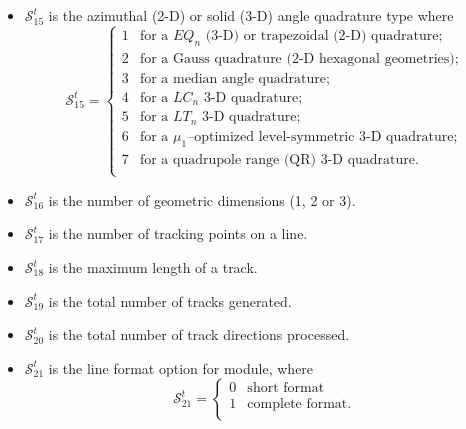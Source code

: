 \begin{itemize}
\item $\mathcal{S}^{t}_{15}$ is the azimuthal (2-D) or solid (3-D) angle quadrature type where
\begin{displaymath}
\mathcal{S}^{t}_{15} = \left\{
\begin{array}{rl}
 1 & \textrm{for a $EQ_n$ (3-D) or trapezoidal (2-D) quadrature;} \\
 2 & \textrm{for a Gauss quadrature (2-D hexagonal geometries);} \\
 3 & \textrm{for a median angle quadrature;} \\
 4 & \textrm{for a $LC_n$ 3-D quadrature;} \\
 5 & \textrm{for a $LT_n$ 3-D quadrature;} \\
 6 & \textrm{for a $\mu_1$--optimized level-symmetric 3-D quadrature;} \\
 7 & \textrm{for a quadrupole range (QR) 3-D quadrature.} \\
\end{array} \right.
\end{displaymath}

\item $\mathcal{S}^{t}_{16}$ is the number of geometric dimensions (1, 2 or 3).

\item $\mathcal{S}^{t}_{17}$ is the number of tracking points on a line.

\item $\mathcal{S}^{t}_{18}$ is the maximum length of a track.

\item $\mathcal{S}^{t}_{19}$ is the total number of tracks generated.

\item $\mathcal{S}^{t}_{20}$ is the total number of track directions processed.

\item $\mathcal{S}^{t}_{21}$ is the line format option for  module, where
\begin{displaymath}
\mathcal{S}^{t}_{21} = \left\{
\begin{array}{rl}
 0 & \textrm{short format} \\
 1 & \textrm{complete format.} \\
\end{array} \right.
\end{displaymath}


\end{itemize}
